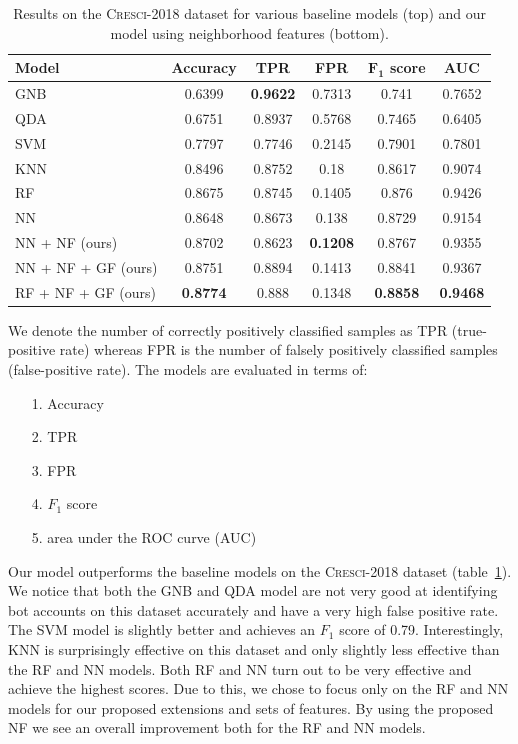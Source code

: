\begin{table}[t]
\centering
\setlength{\tabcolsep}{12pt}
\begin{tabular}{@{}lccccc@{}}
\toprule
\textbf{Model} & \textbf{Accuracy} & \textbf{TPR} & \textbf{FPR} & \textbf{$\boldsymbol{F_1}$ score} & \textbf{AUC} \\ \midrule
GNB             & 0.6399 & \textbf{0.9622} & 0.7313 & 0.741  & 0.7652 \\
QDA             & 0.6751 & 0.8937 & 0.5768 & 0.7465 & 0.6405 \\
SVM             & 0.7797 & 0.7746 & 0.2145 & 0.7901 & 0.7801 \\
KNN             & 0.8496 & 0.8752 & 0.18   & 0.8617 & 0.9074 \\
RF              & 0.8675 & 0.8745 & 0.1405 & 0.876  & 0.9426 \\
NN              & 0.8648 & 0.8673 & 0.138  & 0.8729 & 0.9154 \\ \midrule
NN + NF (ours)  & 0.8702 & 0.8623 & \textbf{0.1208} & 0.8767 & 0.9355 \\
NN + NF + GF (ours) & 0.8751 & 0.8894 & 0.1413 & 0.8841 & 0.9367 \\
RF + NF + GF (ours) & \textbf{0.8774} & 0.888 & 0.1348 & \textbf{0.8858} & \textbf{0.9468} \\
\bottomrule
\end{tabular}
\caption{Results on the \textsc{Cresci-2018} dataset for various baseline models (top) and our model using neighborhood features (bottom).}
\label{tab:results}
\end{table}

\noindent We denote the number of correctly positively classified samples as TPR (true-positive rate) whereas FPR is the number of falsely positively classified samples (false-positive rate). The models are evaluated in terms of:
\begin{itemize}
    \item[1.] Accuracy
    \item[2.] TPR
    \item[3.] FPR
    \item[4.] $F_1$ score
    \item[5.] area under the ROC curve (AUC)
\end{itemize}

Our model outperforms the baseline models on the \textsc{Cresci-2018} dataset (table~\ref{tab:results}). We notice that both the GNB and QDA model are not very good at identifying bot accounts on this dataset accurately and have a very high false positive rate. The SVM model is slightly better and achieves an $F_1$ score of 0.79. Interestingly, KNN is surprisingly effective on this dataset and only slightly less effective than the RF and NN models. Both RF and NN turn out to be very effective and achieve the highest scores. Due to this, we chose to focus only on the RF and NN models for our proposed extensions and sets of features. By using the proposed NF we see an overall improvement both for the RF and NN models.

